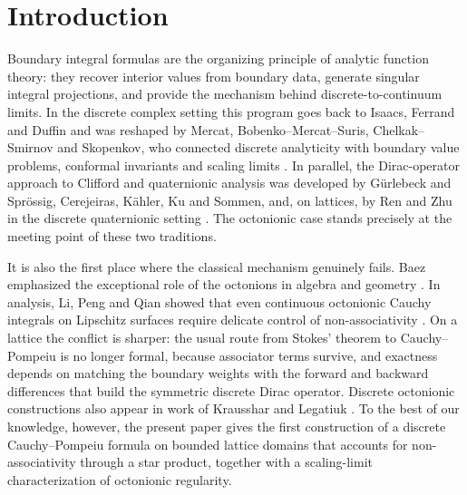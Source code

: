 \documentclass{amsart}
\theoremstyle{definition}
\theoremstyle{remark}
\numberwithin{equation}{section}
\begin{document}
\maketitle




\section{Introduction}

Boundary integral formulas are the organizing principle of analytic function theory: they recover interior values from boundary data, generate singular integral projections, and provide the mechanism behind discrete-to-continuum limits. In the discrete complex setting this program goes back to Isaacs, Ferrand and Duffin and was reshaped by Mercat, Bobenko--Mercat--Suris, Chelkak--Smirnov and Skopenkov, who connected discrete analyticity with boundary value problems, conformal invariants and scaling limits \cite{Isaac,Ferrand,Du,Me,BMS,CS2011,CS2012,Smirnov,Sm,Sk}. In parallel, the Dirac-operator approach to Clifford and quaternionic analysis was developed by G\"urlebeck and Spr\"ossig, Cerejeiras, K\"ahler, Ku and Sommen, and, on lattices, by Ren and Zhu in the discrete quaternionic setting \cite{CSSS2004,GS2,CKS,RZ2017,RZ2022}. The octonionic case stands precisely at the meeting point of these two traditions.

It is also the first place where the classical mechanism genuinely fails. Baez emphasized the exceptional role of the octonions in algebra and geometry \cite{B2002}. In analysis, Li, Peng and Qian showed that even continuous octonionic Cauchy integrals on Lipschitz surfaces require delicate control of non-associativity \cite{LPT2008}. On a lattice the conflict is sharper: the usual route from Stokes' theorem to Cauchy--Pompeiu is no longer formal, because associator terms survive, and exactness depends on matching the boundary weights with the forward and backward differences that build the symmetric discrete Dirac operator. Discrete octonionic constructions also appear in work of Krausshar and Legatiuk \cite{KLL2021,KL}. To the best of our knowledge, however, the present paper gives the first construction of a discrete Cauchy--Pompeiu formula on bounded lattice domains that accounts for non-associativity through a star product, together with a scaling-limit characterization of octonionic regularity.
\end{document}
